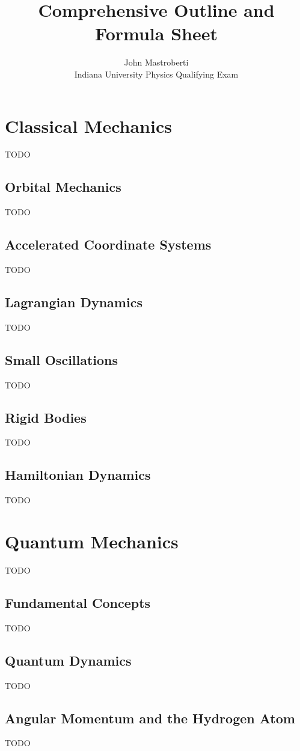 \documentclass[12pt]{article}
\begin{document}
\title{Comprehensive Outline and Formula Sheet}
\author{John Mastroberti\\
Indiana University Physics Qualifying Exam}

\maketitle

\tableofcontents

\section{Classical Mechanics}
TODO
\subsection{Orbital Mechanics}
TODO
\subsection{Accelerated Coordinate Systems}
TODO
\subsection{Lagrangian Dynamics}
TODO
\subsection{Small Oscillations}
TODO
\subsection{Rigid Bodies}
TODO
\subsection{Hamiltonian Dynamics}
TODO


\section{Quantum Mechanics}
TODO
\subsection{Fundamental Concepts}
TODO
\subsection{Quantum Dynamics}
TODO
\subsection{Angular Momentum and the Hydrogen Atom}
TODO
\end{document}
